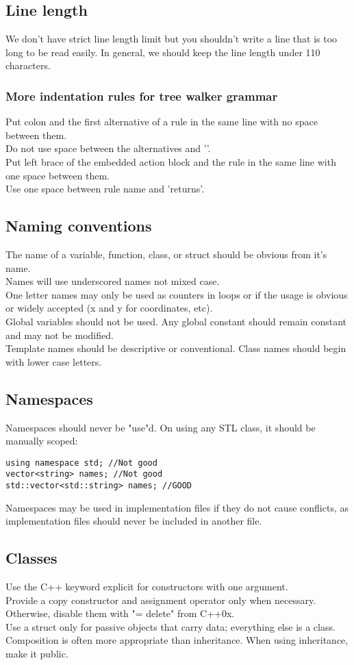 \documentclass[letterpaper,10pt]{article}
\begin{document}
\subsection{Line length}
We don't have strict line length limit but you shouldn't write a line that is too long to be read easily. In general, we should keep the line length under 110 characters.
\subsubsection{More indentation rules for tree walker grammar}
Put colon and the first alternative of a rule in the same line with no space between them.\\
Do not use space between the alternatives and '\textbar'.\\
Put left brace of the embedded action block and the rule in the same line with one space between them.\\
Use one space between rule name and 'returns'.
\subsection{Naming conventions}
The name of a variable, function, class, or struct should be obvious from it's name.\\
Names will use underscored names not mixed case.\\
One letter names may only be used as counters in loops or if the usage is obvious or widely accepted (x and y for coordinates, etc).\\
Global variables should not be used. Any global constant should remain constant and may not be modified.\\
Template names should be descriptive or conventional.
Class names should begin with lower case letters.
\subsection{Namespaces}
Namespaces should never be "use"d.  On using any STL class, it should be manually scoped:
\begin{verbatim}
using namespace std; //Not good
vector<string> names; //Not good
std::vector<std::string> names; //GOOD
\end{verbatim}
Namespaces may be used in implementation files if they do not cause conflicts, as implementation files should never be included in another file.
\subsection{Classes}
Use the C++ keyword explicit for constructors with one argument.\\
Provide a copy constructor and assignment operator only when necessary. Otherwise, disable them with "= delete" from C++0x.\\
Use a struct only for passive objects that carry data; everything else is a class.\\
Composition is often more appropriate than inheritance. When using inheritance, make it public.
\end{document}
